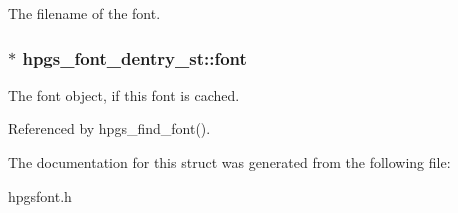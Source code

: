 The filename of the font. 
\subsubsection[font]{$\ast$ {\bf hpgs\_\-font\_\-dentry\_\-st::font}}\label{structhpgs__font__dentry__st_ade4b052ab7e8691c324417d120f14b3}


The font object, if this font is cached. 

Referenced by hpgs\_\-find\_\-font().

The documentation for this struct was generated from the following file:\begin{CompactItemize}
\item 
hpgsfont.h\end{CompactItemize}
